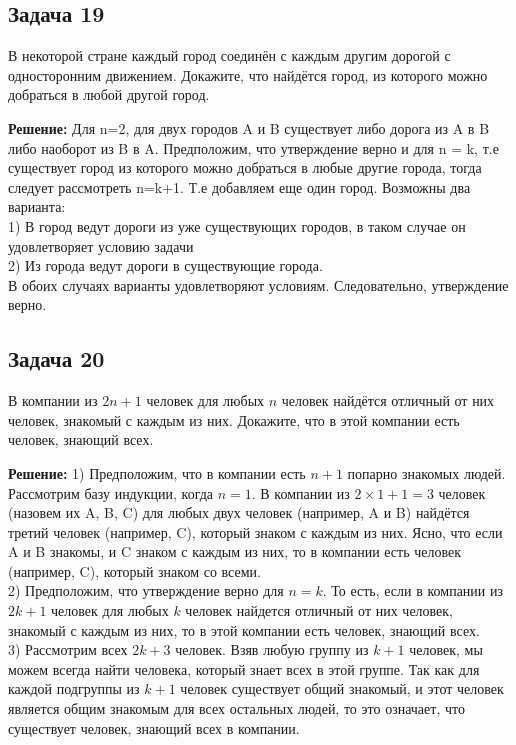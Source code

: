 \documentclass[a4paper,12pt]{article}
\begin{document}
\subsection{Задача 19}
В некоторой стране каждый город соединён с каждым другим дорогой с односторонним движением. Докажите, что найдётся город, из которого можно добраться в любой другой город.

\textbf{Решение:}
Для n=2, для двух городов A и B существует либо дорога из A в B либо наоборот из B в A. Предположим, что утверждение верно и для n = k, т.е существует город из которого можно добраться в любые другие города, тогда следует рассмотреть n=k+1. Т.е добавляем еще один город. Возможны два варианта:\\
1) В город ведут дороги из уже существующих городов, в таком случае он удовлетворяет условию задачи\\
2) Из города ведут дороги в существующие города.\\
В обоих случаях варианты удовлетворяют условиям. Следовательно, утверждение верно.

\vspace{1cm}

\subsection{Задача 20}
В компании из \(2n + 1\) человек для любых \(n\) человек найдётся отличный от них человек, знакомый с каждым из них. Докажите, что в этой компании есть человек, знающий всех.

\textbf{Решение:}
1) Предположим, что в компании есть \( n + 1 \) попарно знакомых людей. Рассмотрим базу индукции, когда \( n = 1 \). В компании из \( 2 \times 1 + 1 = 3 \) человек (назовем их A, B, C) для любых двух человек (например, A и B) найдётся третий человек (например, C), который знаком с каждым из них. Ясно, что если A и B знакомы, и C знаком с каждым из них, то в компании есть человек (например, C), который знаком со всеми. \\
2) Предположим, что утверждение верно для \( n = k \). То есть, если в компании из \( 2k + 1 \) человек для любых \( k \) человек найдется отличный от них человек, знакомый с каждым из них, то в этой компании есть человек, знающий всех. \\
3) Рассмотрим всех \( 2k + 3 \) человек. Взяв любую группу из \( k + 1 \) человек, мы можем всегда найти человека, который знает всех в этой группе. Так как для каждой подгруппы из \( k + 1 \) человек существует общий знакомый, и этот человек является общим знакомым для всех остальных людей, то это означает, что существует человек, знающий всех в компании.
\vspace{1cm}
\end{document}
